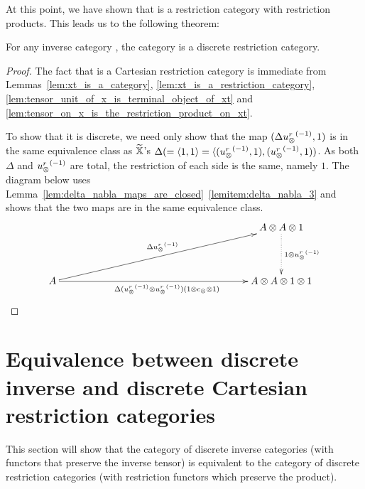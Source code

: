 
At this point, we have shown that \Xt is a restriction category with restriction products. This
leads us to the following theorem:

\begin{theorem}\label{thm:xt_is_a_discrete_crc_when_x_is_an_inverse_category}
  For any inverse category \X, the category \Xt is a discrete restriction category.
\end{theorem}
\begin{proof}
  The fact that \Xt is a Cartesian restriction category is immediate from
  Lemmas~\ref{lem:xt_is_a_category}, \ref{lem:xt_is_a_restriction_category},
  \ref{lem:tensor_unit_of_x_is_terminal_object_of_xt} and
  \ref{lem:tensor_on_x_is_the_restriction_product_on_xt}.

  To show that it is discrete, we need only show that the map $(\Delta {\ensuremath{u_{\otimes}^r}}^{(-1)},1)$ is in the
  same equivalence class as $\widetilde{\mathbb{X}}$'s $\Delta(= \langle1,1\rangle = \langle({u_{\otimes}^r}^{(-1)},1),({u_{\otimes}^r}^{(-1)},1))$. As both
  $\Delta$ and ${u_{\otimes}^r}^{(-1)}$ are total, the restriction of each side is the same, namely $1$. The
  diagram below uses Lemma~\ref{lem:delta_nabla_maps_are_closed}~\ref{lemitem:delta_nabla_3} and
  shows that the two maps are in the same equivalence class.
  \[
    \xymatrix @C=190pt @R=40pt{
      & A \* A \* 1 \ar@{.>}[d]^{1\*\inv{\usr}}\\
      A \ar[ur]^{\Delta\inv{\usr}}
        \ar[r]_{\Delta(\inv{\usr}\*\inv{\usr})(1\*c_{\*}\*1)}& A\*A\*1\*1
    }
  \]
\end{proof}
\section{Equivalence between discrete inverse and discrete Cartesian restriction categories} %
\label{sec:equivalence_of_categories}

This section will show that the category of discrete inverse categories (with functors that preserve
the inverse tensor) is equivalent to the category of discrete restriction categories (with
restriction functors which preserve the product).

